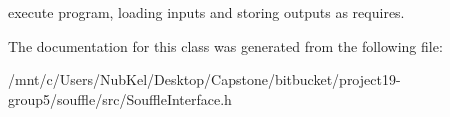 execute program, loading inputs and storing outputs as requires. 

The documentation for this class was generated from the following file\+:\begin{DoxyCompactItemize}
\item 
/mnt/c/\+Users/\+Nub\+Kel/\+Desktop/\+Capstone/bitbucket/project19-\/group5/souffle/src/Souffle\+Interface.\+h\end{DoxyCompactItemize}
